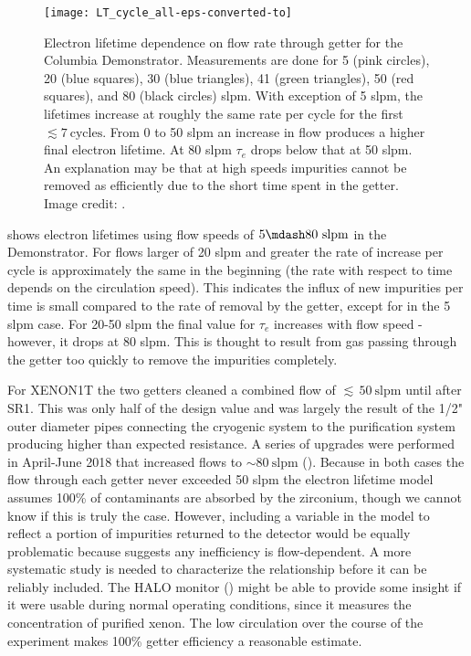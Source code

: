 \begin{figure}
\centering
\texttt{[image: LT\_cycle\_all-eps-converted-to]}
\caption{Electron lifetime dependence on flow rate through getter for the Columbia Demonstrator.  Measurements are done for 5 (pink
circles), 20 (blue squares), 30 (blue
triangles), 41 (green triangles), 50 (red squares), and 80 (black circles) slpm.  With exception of 5 slpm, the lifetimes increase
at roughly the same rate per cycle for the first $\lesssim 7\ \mathrm{cycles}$.  From 0 to 50 slpm an increase in flow produces a higher
final electron
lifetime.  At 80 slpm $\tau_e$ drops below that at 50 slpm.  An explanation may be that at high speeds impurities cannot be removed as
efficiently due to the short time spent in the getter.  Image credit: .}
\label{fig:electron_lifetime_model_removal_demonstrator_circ}
\end{figure}

 shows electron lifetimes using flow speeds of $5 \mdash 80\ \mathrm{slpm}$
in the Demonstrator.  For flows larger of 20 slpm and greater the rate of increase per cycle is approximately the same in the beginning
(the rate with respect to time depends on the circulation speed).  This indicates the influx of new impurities per time is small
compared to the rate of removal by the getter, except for in the 5 slpm case.  For 20-50 slpm the final
value for $\tau_e$ increases with flow speed - however, it drops at 80 slpm.  This is thought
to result from gas passing through the getter too quickly to remove the impurities completely.

For XENON1T the two getters cleaned a combined flow of ${\lesssim}\, 50\ \mathrm{slpm}$ until after SR1.  This was only half of the design
value and was largely the result of the 1/2" outer diameter pipes connecting the cryogenic system to the purification system producing
higher than expected
resistance.  A series of upgrades were performed in April-June 2018 that increased flows to ${\sim} 80\ \mathrm{slpm}$
().  Because in both cases the flow through each getter never exceeded 50 slpm the electron
lifetime model assumes 100\% of contaminants are absorbed by the zirconium, though we cannot know if this is truly the case.  However,
including a variable in the model to reflect a portion of impurities returned
to the detector would be equally problematic because  suggests any
inefficiency is
flow-dependent.  A more systematic study is needed to characterize the relationship before it can be reliably included.  The HALO
monitor () might be able to provide some insight if it were usable during normal operating conditions, since it
measures the  concentration of purified xenon.  The low
circulation over the course of the experiment makes 100\% getter efficiency a reasonable estimate.

